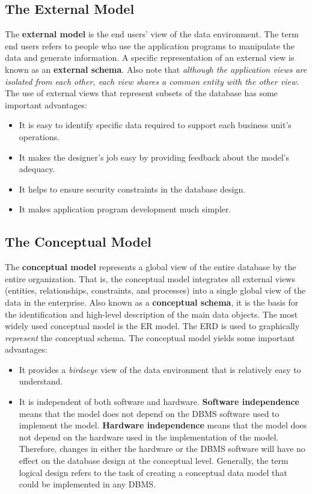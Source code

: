 \documentclass[a4paper, 12pt, titlepage]{report}
\begin{document}
\subsection{The External Model}
The \textbf{external model} is the end users’ view of the data environment. The term end users refers to people who use the application programs to manipulate the data and generate information. A specific representation of an external view is known as an \textbf{external schema}. Also note that \emph{although the application views are isolated from each other, each view shares a common entity with the other view.}
The use of external views that represent subsets of the database has some important advantages:
\begin{itemize}
\item It is easy to identify specific data required to support each business unit’s operations.
\item It makes the designer’s job easy by providing feedback about the model’s adequacy.
\item It helps to ensure security constraints in the database design.
\item It makes application program development much simpler.
\end{itemize}
\subsection{The Conceptual Model}
The \textbf{conceptual model} represents a global view of the entire database by the entire organization. That is, the conceptual model integrates all external views (entities, relationships, constraints, and processes) into a single global view of the data in the enterprise. Also known as a \textbf{conceptual schema}, it is the basis for the identification and high-level description of the main data objects. The most widely used conceptual model is the ER model. The ERD is used to graphically \emph{represent} the conceptual schema. The conceptual model yields some important advantages:
\begin{itemize}
\item It provides a \emph{birdseye} view of the data environment that is relatively easy to understand.
\item It is independent of both software and hardware. \textbf{Software independence} means that the model does not depend on the DBMS software used to implement the model. \textbf{Hardware independence} means that the model does not depend on the hardware used in the implementation of the model. Therefore, changes in either the hardware or the DBMS software will have no effect on the database design at the conceptual level. Generally, the term logical design refers to the task of creating a conceptual data model that could be implemented in any DBMS.
\end{itemize}
\end{document}
